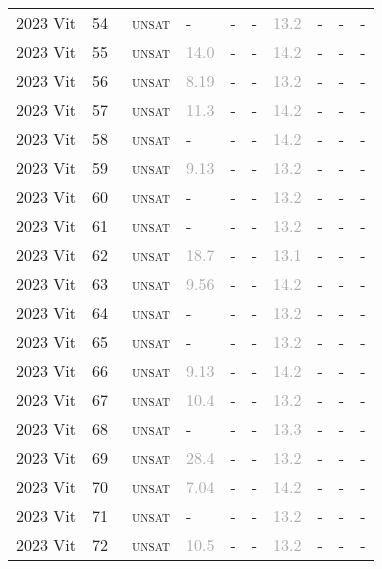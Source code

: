 \begin{center}
{\begin{longtable}{@{}llllllllll@{}}
2023 Vit & 54 & ~\textsc{unsat} & - & - & - & \textcolor{darkgray}{13.2} & - & - & - \\
2023 Vit & 55 & ~\textsc{unsat} & \textcolor{darkgray}{14.0} & - & - & \textcolor{darkgray}{14.2} & - & - & - \\
2023 Vit & 56 & ~\textsc{unsat} & \textcolor{darkgray}{8.19} & - & - & \textcolor{darkgray}{13.2} & - & - & - \\
2023 Vit & 57 & ~\textsc{unsat} & \textcolor{darkgray}{11.3} & - & - & \textcolor{darkgray}{14.2} & - & - & - \\
2023 Vit & 58 & ~\textsc{unsat} & - & - & - & \textcolor{darkgray}{14.2} & - & - & - \\
2023 Vit & 59 & ~\textsc{unsat} & \textcolor{darkgray}{9.13} & - & - & \textcolor{darkgray}{13.2} & - & - & - \\
2023 Vit & 60 & ~\textsc{unsat} & - & - & - & \textcolor{darkgray}{13.2} & - & - & - \\
2023 Vit & 61 & ~\textsc{unsat} & - & - & - & \textcolor{darkgray}{13.2} & - & - & - \\
2023 Vit & 62 & ~\textsc{unsat} & \textcolor{darkgray}{18.7} & - & - & \textcolor{darkgray}{13.1} & - & - & - \\
2023 Vit & 63 & ~\textsc{unsat} & \textcolor{darkgray}{9.56} & - & - & \textcolor{darkgray}{14.2} & - & - & - \\
2023 Vit & 64 & ~\textsc{unsat} & - & - & - & \textcolor{darkgray}{13.2} & - & - & - \\
2023 Vit & 65 & ~\textsc{unsat} & - & - & - & \textcolor{darkgray}{13.2} & - & - & - \\
2023 Vit & 66 & ~\textsc{unsat} & \textcolor{darkgray}{9.13} & - & - & \textcolor{darkgray}{14.2} & - & - & - \\
2023 Vit & 67 & ~\textsc{unsat} & \textcolor{darkgray}{10.4} & - & - & \textcolor{darkgray}{13.2} & - & - & - \\
2023 Vit & 68 & ~\textsc{unsat} & - & - & - & \textcolor{darkgray}{13.3} & - & - & - \\
2023 Vit & 69 & ~\textsc{unsat} & \textcolor{darkgray}{28.4} & - & - & \textcolor{darkgray}{13.2} & - & - & - \\
2023 Vit & 70 & ~\textsc{unsat} & \textcolor{darkgray}{7.04} & - & - & \textcolor{darkgray}{14.2} & - & - & - \\
2023 Vit & 71 & ~\textsc{unsat} & - & - & - & \textcolor{darkgray}{13.2} & - & - & - \\
2023 Vit & 72 & ~\textsc{unsat} & \textcolor{darkgray}{10.5} & - & - & \textcolor{darkgray}{13.2} & - & - & - \\

\end{longtable}}
\end{center}
